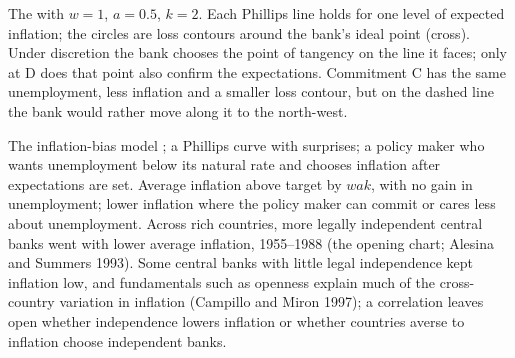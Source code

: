 \begin{omfigure}

{\small The  with $w = 1$, $a = 0.5$, $k = 2$. Each Phillips line holds for one level of expected inflation; the circles are loss contours around the bank's ideal point (cross).
Under discretion the bank chooses the point of tangency on the line it faces; only at D does that point also confirm the
expectations. Commitment C has the same unemployment, less inflation and a smaller loss contour, but on the dashed line the
bank would rather move along it to the north-west.}
\end{omfigure}

\begin{model}{The inflation-bias model}
\assumes {}; a Phillips curve with surprises; a policy maker who wants unemployment below its natural
rate and chooses inflation after expectations are set.
\predicts Average inflation above target by $wak$, with no gain in unemployment; lower inflation where the policy maker can commit or
cares less about unemployment.
\tested Across rich countries, more legally independent central banks went with lower average inflation, 1955--1988 (the
opening chart; Alesina and Summers 1993).
\breaks Some central banks with little legal independence kept inflation low, and fundamentals such as openness explain
much of the cross-country variation in inflation (Campillo and Miron 1997); a correlation leaves open whether
independence lowers inflation or whether countries averse to inflation choose independent banks.
\end{model}

